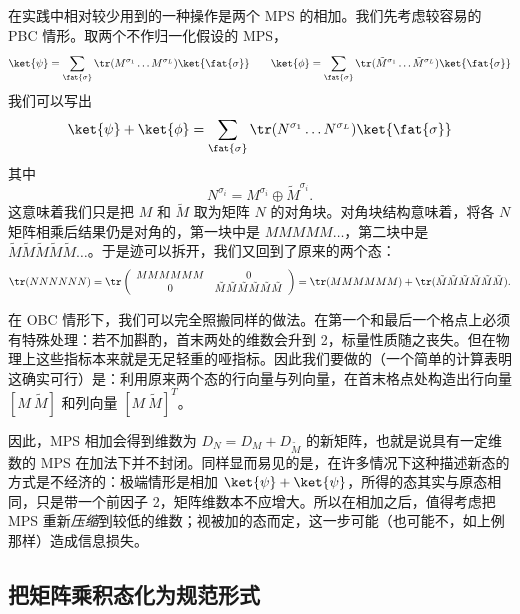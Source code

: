 在实践中相对较少用到的一种操作是两个 MPS 的相加。我们先考虑较容易的 PBC 情形。取两个不作归一化假设的 MPS，
\begin{equation}
\ket{\psi} = \sum_{\fat{\sigma}} \tr (M^{\sigma_1} \ldots M^{\sigma_L}) \ket{\fat{\sigma}} 
\quad\quad
\ket{\phi} = \sum_{\fat{\sigma}} \tr (\tilde{M}^{\sigma_1} \ldots \tilde{M}^{\sigma_L}) \ket{\fat{\sigma}} 
\end{equation}
我们可以写出
\begin{equation}
\ket{\psi} + \ket{\phi} = \sum_{\fat{\sigma}} \tr (N^{\sigma_1} \ldots N^{\sigma_L}) \ket{\fat{\sigma}}
\end{equation}
其中
\begin{equation}
N^{\sigma_i} =  M^{\sigma_i} \oplus \tilde{M}^{\sigma_i} .
\end{equation} 
这意味着我们只是把 $M$ 和 $\tilde{M}$ 取为矩阵 $N$ 的对角块。对角块结构意味着，将各 $N$ 矩阵相乘后结果仍是对角的，第一块中是 $MMMMM\ldots$，第二块中是 $\tilde{M}\tilde{M}\tilde{M}\tilde{M}\tilde{M}\ldots$。于是迹可以拆开，我们又回到了原来的两个态：
\begin{equation}
\tr (NNNNNN) = \tr \left( \begin{array}{cc} MMMMMM & 0 \\ 0 & \tilde{M}\tilde{M}\tilde{M}\tilde{M}\tilde{M}\tilde{M} \end{array} \right) = \tr (MMMMMM) + \tr (\tilde{M}\tilde{M}\tilde{M}\tilde{M}\tilde{M}\tilde{M}).
\end{equation} 

在 OBC 情形下，我们可以完全照搬同样的做法。在第一个和最后一个格点上必须有特殊处理：若不加斟酌，首末两处的维数会升到 2，标量性质随之丧失。但在物理上这些指标本来就是无足轻重的哑指标。因此我们要做的（一个简单的计算表明这确实可行）是：利用原来两个态的行向量与列向量，在首末格点处构造出行向量 $[ M\ \tilde{M}]$ 和列向量 $[M\ \tilde{M}]^T$。

因此，MPS 相加会得到维数为 $D_N = D_M + D_{\tilde{M}}$ 的新矩阵，也就是说具有一定维数的 MPS 在加法下并不封闭。同样显而易见的是，在许多情况下这种描述新态的方式是不经济的：极端情形是相加 $\ket{\psi}+\ket{\psi}$，所得的态其实与原态相同，只是带一个前因子 2，矩阵维数本不应增大。所以在相加之后，值得考虑把 MPS 重新{\em 压缩}到较低的维数；视被加的态而定，这一步可能（也可能不，如上例那样）造成信息损失。

\subsection{把矩阵乘积态化为规范形式}

